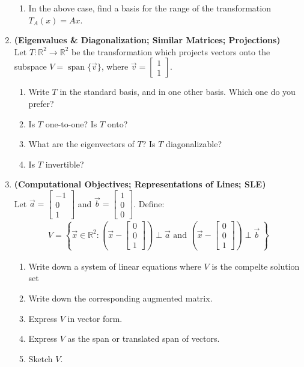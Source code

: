 \documentclass[red]{tutorial}
\newcommand{\R}{\mathbb{R}}
\newcommand{\mat}[1]{\begin{bmatrix} #1 %
\end{bmatrix}}
\DeclareMathOperator{\Span} {span}
\theoremstyle{definition}
\theoremstyle{theorem}
\begin{document}
\begin{tutorial}
\begin{enumerate}
\begin{enumerate}
        \item In the above case, find a basis for the range 
          of the transformation $T_A(x) = Ax$.
      \end{enumerate}
    \item \textbf{(Eigenvalues \& Diagonalization; Similar Matrices; 
      Projections)}\\
      Let $T\colon\R^2\to\R^2$ be the transformation which 
      projects vectors onto the subspace $V=\Span\{\vec v\}$, 
      where $\vec v = \mat{1\\1}$.
      \begin{enumerate}
        \item Write $T$ in the standard basis, and in one other basis. 
          Which one do you prefer?
        \item Is $T$ one-to-one? Is $T$ onto?
        \item What are the eigenvectors of $T$? Is $T$ diagonalizable?
        \item Is $T$ invertible?
      \end{enumerate}
    \item \textbf{(Computational Objectives; Representations of Lines; 
      SLE)}\\
      Let $\vec a = \mat{-1\\0\\1}$ and $\vec b = \mat{1\\0\\0}$. 
      Define:
      \begin{align*}
        V = \left\{\vec x\in \R^2: %
        \left(\vec x - \mat{0\\0\\1}\right)\perp \vec a \text{ and } 
        \left(\vec x - \mat{0\\0\\1}\right)\perp \vec b\ \right\}
      \end{align*}
      \begin{enumerate}
        \item Write down a system of linear equations where 
          $V$ is the compelte solution set
        \item Write down the corresponding augmented matrix.
        \item Express $V$ in vector form.
        \item Express $V$ as the span or translated span of 
          vectors.
        \item Sketch $V$.
      \end{enumerate}
  \end{enumerate}
\end{tutorial}
\end{document}
